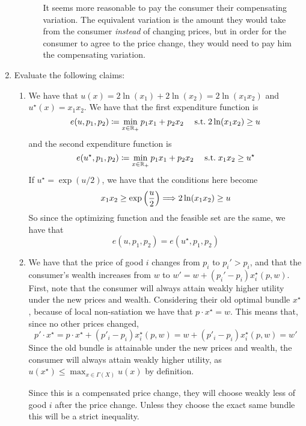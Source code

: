 \documentclass[12pt]{article}
\begin{document}
\begin{enumerate}
\begin{enumerate}
\begin{enumerate}
			It seems more reasonable to pay the consumer their compensating variation. The equivalent variation is the amount they would take from the consumer \emph{instead} of changing prices, but in order for the consumer to agree to the price change, they would need to pay him the compensating variation.
		\end{enumerate}
	\end{enumerate}
	
	\item Evaluate the following claims:
	\begin{enumerate}
		\item We have that $u(x) = 2\ln(x_1) + 2\ln(x_2) = 2\ln(x_1x_2)$ and $u^\star(x) = x_1x_2$. We have that the first expenditure function is
		\[
		e(u,p_1,p_2) \coloneqq \min_{x \in \mathbb{R}_+} p_1x_1 + p_2x_2 \quad \;\text{s.t.}\; 2\ln(x_1x_2) \ge u
		\]
		and the second expenditure function is
		\[
		e(u^\star,p_1,p_2) \coloneqq \min_{x\in\mathbb{R}_+} p_1x_1 + p_2x_2 \quad \;\text{s.t.}\; x_1x_2 \ge u^\star
		\]
		If $u^\star = \exp(u / 2)$, we have that the conditions here become
		\[
		x_1x_2 \ge \exp\left( \frac{u}{2}\right) \Longrightarrow 2\ln(x_1x_2) \ge u
		\]
		So since the optimizing function and the feasible set are the same, we have that
		\[
		e(u,p_1,p_2) = e(u^\star,p_1,p_2)
		\]
		\item We have that the price of good $i$ changes from $p_i$ to $p_i' > p_i$, and that the consumer's wealth increases from $w$ to $w' = w + (p_i' - p_i)x^\star_i(p,w)$. First, note that the consumer will always attain weakly higher utility under the new prices and wealth. Considering their old optimal bundle $x^\star$, because of local non-satiation we have that $p \cdot x^\star = w$. This means that, since no other prices changed, 
		\[
		p' \cdot x^\star = p \cdot x^\star + (p'_i - p_i)x^\star_i(p,w) = w + (p'_i - p_i)x^\star_i(p,w) = w'
		\]
		Since the old bundle is attainable under the new prices and wealth, the consumer will always attain weakly higher utility, as $u(x^\star) \le \max_{x \in \Gamma(X)} u(x)$ by definition. 
		
		Since this is a compensated price change, they will choose weakly less of good $i$ after the price change. Unless they choose the exact same bundle this will be a strict inequality.
		

\end{enumerate}
\end{enumerate}
\end{document}
